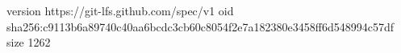 version https://git-lfs.github.com/spec/v1
oid sha256:c9113b6a89740c40aa6bcdc3cb60c8054f2e7a182380e3458ff6d548994c57df
size 1262
